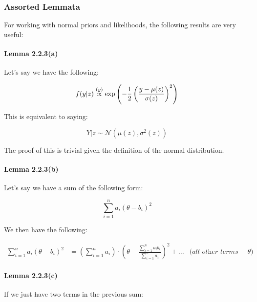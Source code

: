 \documentclass[a4paper]{article}
\begin{document}
            \subsubsection{Assorted Lemmata}
                For working with normal priors and likelihoods, the following
                results are very useful:

                \paragraph{Lemma 2.2.3(a)}
                    Let's say we have the following:

                    \[
                        f(y | z) \stackrel{({y})}{\propto} \exp\left(-\frac{1}{2}\left(
                        \frac{y - \mu(z)}{\sigma(z)}\right)^2\right)
                    \]

                    This is equivalent to saying:

                    \[
                        Y | z \sim \mathcal{N}(\mu(z), \sigma^2(z))
                    \]

                    The proof of this is trivial given the definition of the
                    normal distribution.

                \paragraph{Lemma 2.2.3(b)}
                    Let's say we have a sum of the following form:

                    \[
                        \sum_{i=1}^n a_i (\theta - b_i)^2
                    \]

                    We then have the following:

                    \begin{align*}
                        \sum_{i=1}^n a_i (\theta - b_i)^2 & = \left(\sum_{i=1}^n
                            a_i\right) \cdot \left(\theta -
                            \frac{\sum\limits_{i=1}^na_ib_i}{\sum\limits_{i=1}^n
                            a_i}\right)^2 + ... & \textit{(all other terms are
                            independent of $\theta$)}
                    \end{align*}

                \paragraph{Lemma 2.2.3(c)}
                    If we just have two terms in the previous sum:
\end{document}
